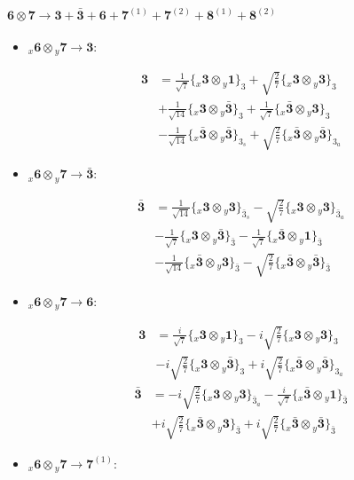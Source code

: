 \documentclass[english]{article}
\newcommand{\cgEqFontsize}{\large}
\newcommand{\rep}[1]{\mathbf{#1}}
\newcommand{\repx}[2]{{}_{#2}\mathbf{#1}}
\newcommand{\tsprod}[2]{\rep{#1}\otimes\rep{#2}}
\newcommand{\tsprodx}[2]{\repx{#1}{x}\otimes\repx{#2}{y}}
\newcommand{\subcgt}[3]{\big\{ \tsprodx{#1}{#2}\big\}^{}_{#3}}
\begin{document}
\paragraph*{\cgEqFontsize $\tsprod{6}{7}\to\rep{3}+\rep{\bar{3}}+\rep{6}+\rep{7}^{(1)}+\rep{7}^{(2)}+\rep{8}^{(1)}+\rep{8}^{(2)}$}
\begin{itemize}
\item $\tsprodx{6}{7}\to\rep{3}$:
\begin{fleqn}
\begin{align*}
\rep{3} & = \frac{1}{\sqrt{7}}\subcgt{3}{1}{3}+\sqrt{\frac{2}{7}}\subcgt{3}{3}{3} \\ 
 & +\frac{1}{\sqrt{14}}\subcgt{3}{\bar{3}}{3}+\frac{1}{\sqrt{7}}\subcgt{\bar{3}}{3}{3} \\ 
 & -\frac{1}{\sqrt{14}}\subcgt{\bar{3}}{\bar{3}}{3_{s}}+\sqrt{\frac{2}{7}}\subcgt{\bar{3}}{\bar{3}}{3_{a}}
\end{align*}
\end{fleqn}
\item $\tsprodx{6}{7}\to\rep{\bar{3}}$:
\begin{fleqn}
\begin{align*}
\rep{\bar{3}} & = \frac{1}{\sqrt{14}}\subcgt{3}{3}{\bar{3}_{s}}-\sqrt{\frac{2}{7}}\subcgt{3}{3}{\bar{3}_{a}} \\ 
 & -\frac{1}{\sqrt{7}}\subcgt{3}{\bar{3}}{\bar{3}}-\frac{1}{\sqrt{7}}\subcgt{\bar{3}}{1}{\bar{3}} \\ 
 & -\frac{1}{\sqrt{14}}\subcgt{\bar{3}}{3}{\bar{3}}-\sqrt{\frac{2}{7}}\subcgt{\bar{3}}{\bar{3}}{\bar{3}}
\end{align*}
\end{fleqn}
\item $\tsprodx{6}{7}\to\rep{6}$:
\begin{fleqn}
\begin{align*}
\rep{3} & = \frac{i}{\sqrt{7}}\subcgt{3}{1}{3}-i \sqrt{\frac{2}{7}}\subcgt{3}{3}{3} \\ 
 & -i \sqrt{\frac{2}{7}}\subcgt{3}{\bar{3}}{3}+i \sqrt{\frac{2}{7}}\subcgt{\bar{3}}{\bar{3}}{3_{a}}
\end{align*}
\begin{align*}
\rep{\bar{3}} & = -i \sqrt{\frac{2}{7}}\subcgt{3}{3}{\bar{3}_{a}}-\frac{i}{\sqrt{7}}\subcgt{\bar{3}}{1}{\bar{3}} \\ 
 & +i \sqrt{\frac{2}{7}}\subcgt{\bar{3}}{3}{\bar{3}}+i \sqrt{\frac{2}{7}}\subcgt{\bar{3}}{\bar{3}}{\bar{3}}
\end{align*}
\end{fleqn}
\item $\tsprodx{6}{7}\to\rep{7}^{(1)}$:

\end{itemize}
\end{document}
